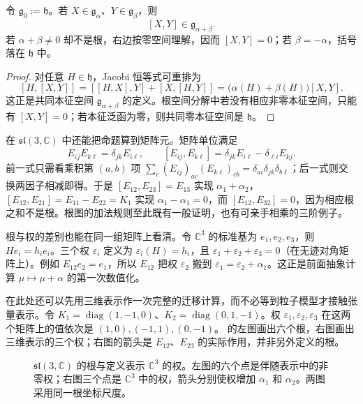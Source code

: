 \begin{proposition}[根空间的括号如何相加]
令 $\mathfrak g_0:=\mathfrak h$。若 $X\in\mathfrak g_\alpha$、$Y\in\mathfrak g_\beta$，则
\[
[X,Y]\in\mathfrak g_{\alpha+\beta}.
\]
若 $\alpha+\beta\ne0$ 却不是根，右边按零空间理解，因而 $[X,Y]=0$；若 $\beta=-\alpha$，括号落在 $\mathfrak h$ 中。
\end{proposition}

\begin{proof}
对任意 $H\in\mathfrak h$，Jacobi 恒等式可重排为
\[
[H,[X,Y]]=[[H,X],Y]+[X,[H,Y]]
=\bigl(\alpha(H)+\beta(H)\bigr)[X,Y].
\]
这正是共同本征空间 $\mathfrak g_{\alpha+\beta}$ 的定义。根空间分解中若没有相应非零本征空间，只能有 $[X,Y]=0$；若本征泛函为零，则共同零本征空间是 $\mathfrak h$。
\end{proof}

在 $\mathfrak{sl}(3,\mathbb C)$ 中还能把命题算到矩阵元。矩阵单位满足
\[
E_{ij}E_{k\ell}=\delta_{jk}E_{i\ell},\qquad
[E_{ij},E_{k\ell}]
=\delta_{jk}E_{i\ell}-\delta_{\ell i}E_{kj}.
\]
前一式只需看乘积第 $(a,b)$ 项
$\sum_c(E_{ij})_{ac}(E_{k\ell})_{cb}
=\delta_{ai}\delta_{jk}\delta_{b\ell}$；后一式则交换两因子相减即得。于是
$[E_{12},E_{23}]=E_{13}$ 实现 $\alpha_1+\alpha_2$，
$[E_{12},E_{21}]=E_{11}-E_{22}=K_1$ 实现 $\alpha_1-\alpha_1=0$，而
$[E_{12},E_{32}]=0$，因为相应根之和不是根。根图的加法规则至此既有一般证明，也有可亲手相乘的三阶例子。

根与权的差别也能在同一组矩阵上看清。令 \(\mathbb C^3\) 的标准基为 \(e_1,e_2,e_3\)，则 \(He_i=h_i e_i\)。三个权 \(\varepsilon_i\) 定义为 \(\varepsilon_i(H)=h_i\)，且 \(\varepsilon_1+\varepsilon_2+\varepsilon_3=0\)（在无迹对角矩阵上）。例如 \(E_{12}e_2=e_1\)，所以 \(E_{12}\) 把权 \(\varepsilon_2\) 搬到 \(\varepsilon_1=\varepsilon_2+\alpha_1\)。这正是前面抽象计算 \(\mu\mapsto\mu+\alpha\) 的第一次数值化。

在此处还可以先用三维表示作一次完整的迁移计算，而不必等到粒子模型才接触张量表示。令 $K_1=\operatorname{diag}(1,-1,0)$、$K_2=\operatorname{diag}(0,1,-1)$。权 $\varepsilon_1,\varepsilon_2,\varepsilon_3$ 在这两个矩阵上的值依次是 $(1,0),(-1,1),(0,-1)$。 的左图画出六个根，右图画出三维表示的三个权；右图的箭头是 $E_{12}$、$E_{23}$ 的实际作用，并非另外定义的根。

\begin{figure}[htbp]
\centering

\caption{$\mathfrak{sl}(3,\mathbb C)$ 的根与定义表示 $\mathbb C^3$ 的权。左图的六个点是伴随表示中的非零权；右图三个点是 $\mathbb C^3$ 中的权，箭头分别使权增加 $\alpha_1$ 和 $\alpha_2$。两图采用同一根坐标尺度。}
\label{fig:su3-roots-defining-weights}
\end{figure}

